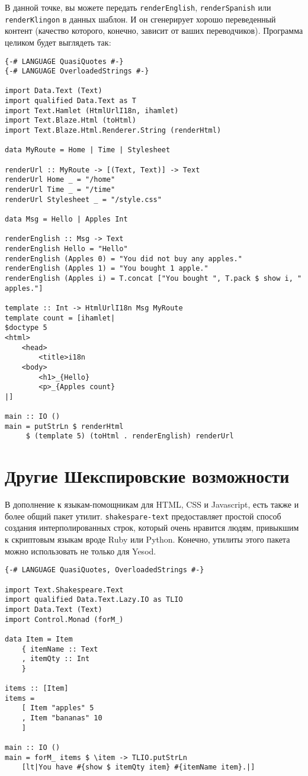 В данной точке, вы можете передать \lstinline!renderEnglish!, 
\lstinline!renderSpanish! или \lstinline!renderKlingon! в данных шаблон. И он
сгенерирует хорошо переведенный контент (качество которого, конечно, зависит от
ваших переводчиков). Программа целиком будет выглядеть так:
\begin{lstlisting}
{-# LANGUAGE QuasiQuotes #-}
{-# LANGUAGE OverloadedStrings #-}

import Data.Text (Text)
import qualified Data.Text as T
import Text.Hamlet (HtmlUrlI18n, ihamlet)
import Text.Blaze.Html (toHtml)
import Text.Blaze.Html.Renderer.String (renderHtml)

data MyRoute = Home | Time | Stylesheet

renderUrl :: MyRoute -> [(Text, Text)] -> Text
renderUrl Home _ = "/home"
renderUrl Time _ = "/time"
renderUrl Stylesheet _ = "/style.css"

data Msg = Hello | Apples Int

renderEnglish :: Msg -> Text
renderEnglish Hello = "Hello"
renderEnglish (Apples 0) = "You did not buy any apples."
renderEnglish (Apples 1) = "You bought 1 apple."
renderEnglish (Apples i) = T.concat ["You bought ", T.pack $ show i, " apples."]

template :: Int -> HtmlUrlI18n Msg MyRoute
template count = [ihamlet|
$doctype 5
<html>
    <head>
        <title>i18n
    <body>
        <h1>_{Hello}
        <p>_{Apples count}
|]

main :: IO ()
main = putStrLn $ renderHtml
     $ (template 5) (toHtml . renderEnglish) renderUrl
\end{lstlisting}

\section{Другие Шекспировские возможности}

В дополнение к языкам-помощникам для HTML, CSS и Javascript, есть также и более
общий пакет утилит. \lstinline!shakespare-text! предоставляет простой способ 
создания интерполированных строк, который очень нравится людям, привыкшим к 
скриптовым языкам вроде Ruby или Python. Конечно, утилиты этого пакета можно
использовать не только для Yesod.

\begin{lstlisting}
{-# LANGUAGE QuasiQuotes, OverloadedStrings #-}

import Text.Shakespeare.Text
import qualified Data.Text.Lazy.IO as TLIO
import Data.Text (Text)
import Control.Monad (forM_)

data Item = Item
    { itemName :: Text
    , itemQty :: Int
    }

items :: [Item]
items =
    [ Item "apples" 5
    , Item "bananas" 10
    ]

main :: IO ()
main = forM_ items $ \item -> TLIO.putStrLn
    [lt|You have #{show $ itemQty item} #{itemName item}.|]
\end{lstlisting}

